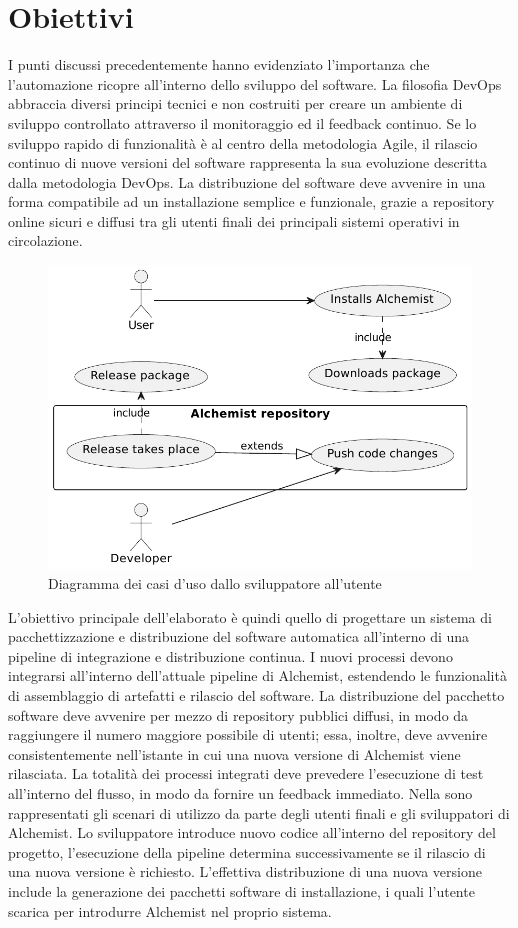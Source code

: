 \section{Obiettivi}
I punti discussi precedentemente hanno evidenziato l'importanza che l'automazione ricopre all'interno dello sviluppo del software. La filosofia DevOps abbraccia diversi principi tecnici e non costruiti per creare un ambiente di sviluppo controllato attraverso il monitoraggio ed il feedback continuo. Se lo sviluppo rapido di funzionalità è al centro della metodologia Agile, il rilascio continuo di nuove versioni del software rappresenta la sua evoluzione descritta dalla metodologia DevOps. La distribuzione del software deve avvenire in una forma compatibile ad un installazione semplice e funzionale, grazie a repository online sicuri e diffusi tra gli utenti finali dei principali sistemi operativi in circolazione.

\begin{figure}[htb]
	\centering
	\includegraphics[width=.75\linewidth]{figures/use-case-diagram.pdf}
	\caption{Diagramma dei casi d'uso dallo sviluppatore all'utente}
	\label{fig:use-case-diagram}
\end{figure}

L'obiettivo principale dell'elaborato è quindi quello di progettare un sistema di pacchettizzazione e distribuzione del software automatica all'interno di una pipeline di integrazione e distribuzione continua. I nuovi processi devono integrarsi all'interno dell'attuale pipeline di Alchemist, estendendo le funzionalità di assemblaggio di artefatti e rilascio del software. La distribuzione del pacchetto software deve avvenire per mezzo di repository pubblici diffusi, in modo da raggiungere il numero maggiore possibile di utenti; essa, inoltre, deve avvenire consistentemente nell'istante in cui una nuova versione di Alchemist viene rilasciata. La totalità dei processi integrati deve prevedere l'esecuzione di test all'interno del flusso, in modo da fornire un feedback immediato. Nella  sono rappresentati gli scenari di utilizzo da parte degli utenti finali e gli sviluppatori di Alchemist. Lo sviluppatore introduce nuovo codice all'interno del repository del progetto, l'esecuzione della pipeline determina successivamente se il rilascio di una nuova versione è richiesto. L'effettiva distribuzione di una nuova versione include la generazione dei pacchetti software di installazione, i quali l'utente scarica per introdurre Alchemist nel proprio sistema.
